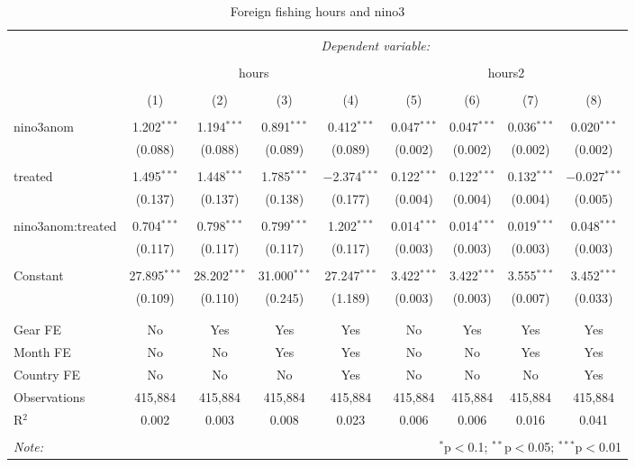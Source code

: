 
\begin{table}[!htbp] \centering 
  \caption{\label{tab:ff_reg}Foreign fishing hours and nino3} 
  \label{} 
\small 
\begin{tabular}{@{\extracolsep{5pt}}lcccccccc} 
\\[-1.8ex]\hline 
\hline \\[-1.8ex] 
 & \multicolumn{8}{c}{\textit{Dependent variable:}} \\ 
\cline{2-9} 
\\[-1.8ex] & \multicolumn{4}{c}{hours} & \multicolumn{4}{c}{hours2} \\ 
\\[-1.8ex] & (1) & (2) & (3) & (4) & (5) & (6) & (7) & (8)\\ 
\hline \\[-1.8ex] 
 nino3anom & 1.202$^{***}$ & 1.194$^{***}$ & 0.891$^{***}$ & 0.412$^{***}$ & 0.047$^{***}$ & 0.047$^{***}$ & 0.036$^{***}$ & 0.020$^{***}$ \\ 
  & (0.088) & (0.088) & (0.089) & (0.089) & (0.002) & (0.002) & (0.002) & (0.002) \\ 
  & & & & & & & & \\ 
 treated & 1.495$^{***}$ & 1.448$^{***}$ & 1.785$^{***}$ & $-$2.374$^{***}$ & 0.122$^{***}$ & 0.122$^{***}$ & 0.132$^{***}$ & $-$0.027$^{***}$ \\ 
  & (0.137) & (0.137) & (0.138) & (0.177) & (0.004) & (0.004) & (0.004) & (0.005) \\ 
  & & & & & & & & \\ 
 nino3anom:treated & 0.704$^{***}$ & 0.798$^{***}$ & 0.799$^{***}$ & 1.202$^{***}$ & 0.014$^{***}$ & 0.014$^{***}$ & 0.019$^{***}$ & 0.048$^{***}$ \\ 
  & (0.117) & (0.117) & (0.117) & (0.117) & (0.003) & (0.003) & (0.003) & (0.003) \\ 
  & & & & & & & & \\ 
 Constant & 27.895$^{***}$ & 28.202$^{***}$ & 31.000$^{***}$ & 27.247$^{***}$ & 3.422$^{***}$ & 3.422$^{***}$ & 3.555$^{***}$ & 3.452$^{***}$ \\ 
  & (0.109) & (0.110) & (0.245) & (1.189) & (0.003) & (0.003) & (0.007) & (0.033) \\ 
  & & & & & & & & \\ 
\hline \\[-1.8ex] 
Gear FE & No & Yes & Yes & Yes & No & Yes & Yes & Yes \\ 
Month FE & No & No & Yes & Yes & No & No & Yes & Yes \\ 
Country FE & No & No & No & Yes & No & No & No & Yes \\ 
Observations & 415,884 & 415,884 & 415,884 & 415,884 & 415,884 & 415,884 & 415,884 & 415,884 \\ 
R$^{2}$ & 0.002 & 0.003 & 0.008 & 0.023 & 0.006 & 0.006 & 0.016 & 0.041 \\ 
\hline 
\hline \\[-1.8ex] 
\textit{Note:}  & \multicolumn{8}{r}{$^{*}$p$<$0.1; $^{**}$p$<$0.05; $^{***}$p$<$0.01} \\ 
\end{tabular} 
\end{table} 

